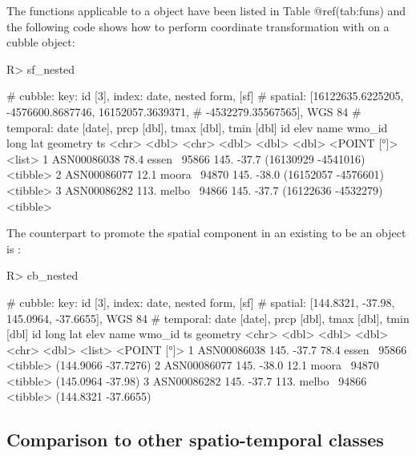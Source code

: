\documentclass[
]{jss}
\begin{document}
The  functions applicable to a  object have been
listed in Table @ref(tab:funs) and the following code shows how to
perform coordinate transformation with  on a cubble
object:

\begin{CodeChunk}
\begin{CodeInput}
R> sf_nested %
\end{CodeInput}
\begin{CodeOutput}
# cubble:   key: id [3], index: date, nested form, [sf]
# spatial:  [16122635.6225205, -4576600.8687746, 16152057.3639371,
#   -4532279.35567565], WGS 84
# temporal: date [date], prcp [dbl], tmax [dbl], tmin [dbl]
  id           elev name   wmo_id  long   lat            geometry ts      
  <chr>       <dbl> <chr>   <dbl> <dbl> <dbl>         <POINT [°]> <list>  
1 ASN00086038  78.4 essen~  95866  145. -37.7 (16130929 -4541016) <tibble>
2 ASN00086077  12.1 moora~  94870  145. -38.0 (16152057 -4576601) <tibble>
3 ASN00086282 113.  melbo~  94866  145. -37.7 (16122636 -4532279) <tibble>
\end{CodeOutput}
\end{CodeChunk}

The counterpart to promote the spatial component in an existing
 to be an  object is :

\begin{CodeChunk}
\begin{CodeInput}
R> cb_nested %
\end{CodeInput}
\begin{CodeOutput}
# cubble:   key: id [3], index: date, nested form, [sf]
# spatial:  [144.8321, -37.98, 145.0964, -37.6655], WGS 84
# temporal: date [date], prcp [dbl], tmax [dbl], tmin [dbl]
  id           long   lat  elev name   wmo_id ts                  geometry
  <chr>       <dbl> <dbl> <dbl> <chr>   <dbl> <list>           <POINT [°]>
1 ASN00086038  145. -37.7  78.4 essen~  95866 <tibble> (144.9066 -37.7276)
2 ASN00086077  145. -38.0  12.1 moora~  94870 <tibble>   (145.0964 -37.98)
3 ASN00086282  145. -37.7 113.  melbo~  94866 <tibble> (144.8321 -37.6655)
\end{CodeOutput}
\end{CodeChunk}

\hypertarget{tidyverse}{%
\subsection{Comparison to other spatio-temporal
classes}\label{tidyverse}}
\end{document}
